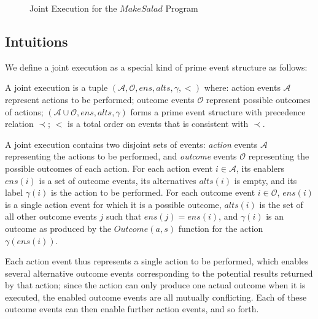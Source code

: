 %
\begin{figure}[!h]

\caption{Joint Execution for the $MakeSalad$ Program}


\label{fig:JE:MakeSalad1} 
\end{figure}



\subsection{Intuitions}

We define a joint execution as a special kind of prime event structure
as follows:

\begin{defnL}
 A joint execution is a tuple $(\mathcal{A},\mathcal{O},ens,alts,\gamma,<)$
where: action events $\mathcal{A}$ represent actions to be performed;
outcome events $\mathcal{O}$ represent possible outcomes of actions;
$(\mathcal{A}\cup\mathcal{O},ens,alts,\gamma)$ forms a prime event
structure with precedence relation $\prec$; $<$ is a total order
on events that is consistent with $\prec$. 
\end{defnL}
A joint execution contains two disjoint sets of events: \emph{action}
events $\mathcal{A}$ representing the actions to be performed, and
\emph{outcome} events $\mathcal{O}$ representing the possible outcomes
of each action. For each action event $i\in\mathcal{A}$, its enablers
$ens(i)$ is a set of outcome events, its alternatives $alts(i)$
is empty, and its label $\gamma(i)$ is the action to be performed.
For each outcome event $i\in\mathcal{O}$, $ens(i)$ is a single action
event for which it is a possible outcome, $alts(i)$ is the set of
all other outcome events $j$ such that $ens(j)=ens(i)$, and $\gamma(i)$
is an outcome as produced by the $Outcome(a,s)$ function for the
action $\gamma(ens(i))$.

Each action event thus represents a single action to be performed,
which enables several alternative outcome events corresponding to
the potential results returned by that action; since the action can
only produce one actual outcome when it is executed, the enabled outcome
events are all mutually conflicting. Each of these outcome events
can then enable further action events, and so forth.

